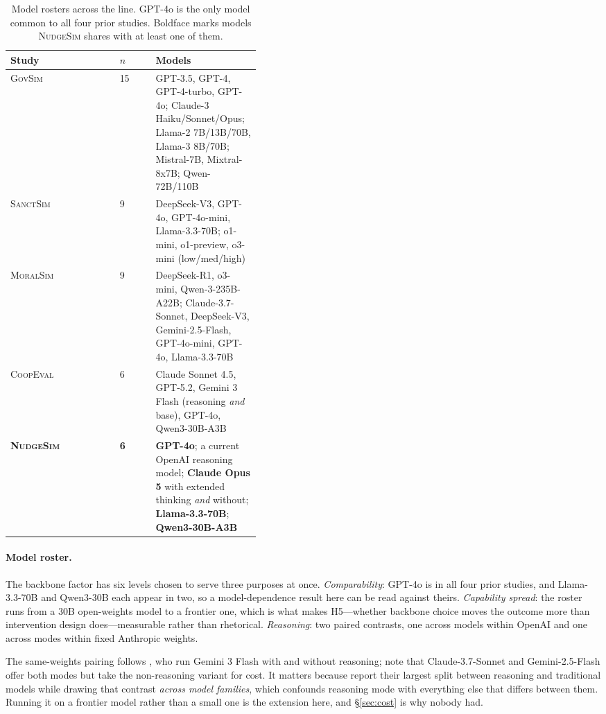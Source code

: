 \documentclass{article}
\begin{document}
\begin{table}[t]
\centering\small
\begin{tabular}{llp{0.42\linewidth}}
\toprule
Study & $n$ & Models \\
\midrule
\textsc{GovSim} \citep{piatti2024govsim} & 15 &
  GPT-3.5, GPT-4, GPT-4-turbo, GPT-4o; Claude-3 Haiku/Sonnet/Opus;
  Llama-2 7B/13B/70B, Llama-3 8B/70B; Mistral-7B, Mixtral-8x7B;
  Qwen-72B/110B \\
\textsc{SanctSim} \citep{piedrahita2025sanctsim} & 9 &
  DeepSeek-V3, GPT-4o, GPT-4o-mini, Llama-3.3-70B;
  o1-mini, o1-preview, o3-mini (low/med/high) \\
\textsc{MoralSim} \citep{backmann2025moralsim} & 9 &
  DeepSeek-R1, o3-mini, Qwen-3-235B-A22B; Claude-3.7-Sonnet, DeepSeek-V3,
  Gemini-2.5-Flash, GPT-4o-mini, GPT-4o, Llama-3.3-70B \\
\textsc{CoopEval} \citep{tewolde2026coopeval} & 6 &
  Claude Sonnet 4.5, GPT-5.2, Gemini 3 Flash (reasoning \emph{and} base),
  GPT-4o, Qwen3-30B-A3B \\
\midrule
\textbf{\textsc{NudgeSim}} & \textbf{6} &
  \textbf{GPT-4o}; a current OpenAI reasoning model; \textbf{Claude Opus 5}
  with extended thinking \emph{and} without; \textbf{Llama-3.3-70B};
  \textbf{Qwen3-30B-A3B} \\
\bottomrule
\end{tabular}
\caption{Model rosters across the line. GPT-4o is the only model common to all
four prior studies. Boldface marks models \textsc{NudgeSim} shares with at least
one of them.}
\label{tab:rosters}
\end{table}

\paragraph{Model roster.}
The backbone factor has six levels chosen to serve three purposes at once.
\emph{Comparability}: GPT-4o is in all four prior studies, and Llama-3.3-70B and
Qwen3-30B each appear in two, so a model-dependence result here can be read
against theirs. \emph{Capability spread}: the roster runs from a 30B
open-weights model to a frontier one, which is what makes H5---whether backbone
choice moves the outcome more than intervention design does---measurable rather
than rhetorical. \emph{Reasoning}: two paired contrasts, one across models
within OpenAI and one across modes within fixed Anthropic weights.

The same-weights pairing follows \citet{tewolde2026coopeval}, who run Gemini 3
Flash with and without reasoning; \citet{backmann2025moralsim} note that
Claude-3.7-Sonnet and Gemini-2.5-Flash offer both modes but take the
non-reasoning variant for cost. It matters because
\citet{piedrahita2025sanctsim} report their largest split between reasoning and
traditional models while drawing that contrast \emph{across model families},
which confounds reasoning mode with everything else that differs between them.
Running it on a frontier model rather than a small one is the extension here,
and \S\ref{sec:cost} is why nobody had.
\end{document}
